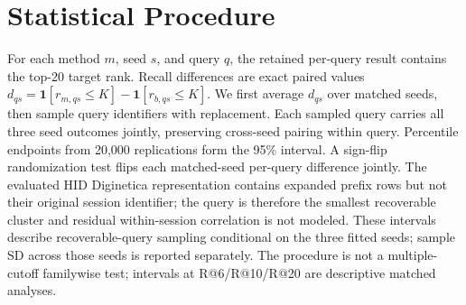 \documentclass[runningheads]{llncs}
\begin{document}
\section{Statistical Procedure}
For each method $m$, seed $s$, and query $q$, the retained per-query result
contains the top-20 target rank. Recall differences are exact paired values
$d_{qs}=\mathbf1[r_{m,qs}\leq K]-\mathbf1[r_{b,qs}\leq K]$.
We first average $d_{qs}$ over matched seeds, then sample query identifiers
with replacement. Each sampled query carries all three seed outcomes jointly,
preserving cross-seed pairing within query. Percentile endpoints from 20,000
replications form the 95\% interval. A sign-flip randomization test flips each
matched-seed per-query difference jointly. The evaluated HID Diginetica
representation contains expanded prefix rows but not their original session
identifier; the query is
therefore the smallest recoverable cluster and residual within-session
correlation is not modeled. These intervals describe recoverable-query
sampling conditional on the three fitted seeds; sample SD across those seeds
is reported separately.
The procedure is not a multiple-cutoff familywise test;
intervals at R@6/R@10/R@20 are descriptive matched analyses.
\end{document}
